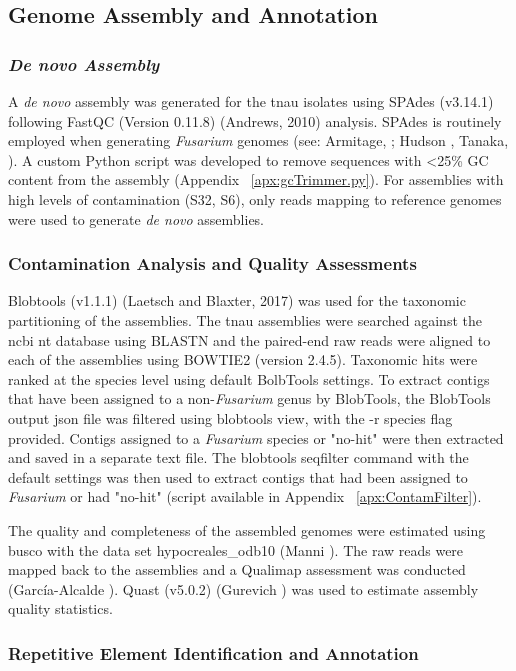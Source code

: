 \subsection{Genome Assembly and Annotation}

\subsubsection{\textit{De novo Assembly}}
A \textit{de novo} assembly was generated for the \ac{tnau} isolates using SPAdes (v3.14.1) following FastQC (Version 0.11.8) (Andrews, 2010) analysis. SPAdes is routinely employed when generating \textit{Fusarium} genomes (see: Armitage, ; Hudson , Tanaka, ). A custom Python script was developed to remove sequences with <25\% GC content from the assembly (Appendix ~\ref{apx:gcTrimmer.py}). For assemblies with high levels of contamination (S32, S6), only reads mapping to reference genomes were used to generate \textit{de novo} assemblies.

\subsubsection{Contamination Analysis and Quality Assessments}
Blobtools (v1.1.1) (Laetsch and Blaxter, 2017) was used for the taxonomic partitioning of the assemblies. The \ac{tnau} assemblies were searched against the \ac{ncbi} nt database using BLASTN and the paired-end raw reads were aligned to each of the assemblies using BOWTIE2 (version 2.4.5). Taxonomic hits were ranked at the species level using default BolbTools settings. To extract contigs that have been assigned to a non-\textit{Fusarium} genus by BlobTools, the BlobTools output json file was filtered using blobtools view, with the -r species flag provided. Contigs assigned to a \textit{Fusarium} species or "no-hit" were then extracted and saved in a separate text file. The blobtools seqfilter command with the default settings was then used to extract contigs that had been assigned to \textit{Fusarium} or had "no-hit" (script available in Appendix ~\ref{apx:ContamFilter}).

The quality and completeness of the assembled genomes were estimated using \ac{busco} with the data set hypocreales\_odb10 (Manni ). The raw reads were mapped back to the assemblies and a Qualimap assessment was conducted (García-Alcalde ). Quast (v5.0.2) (Gurevich ) was used to estimate assembly quality statistics. 

\subsubsection{Repetitive Element Identification and Annotation}


